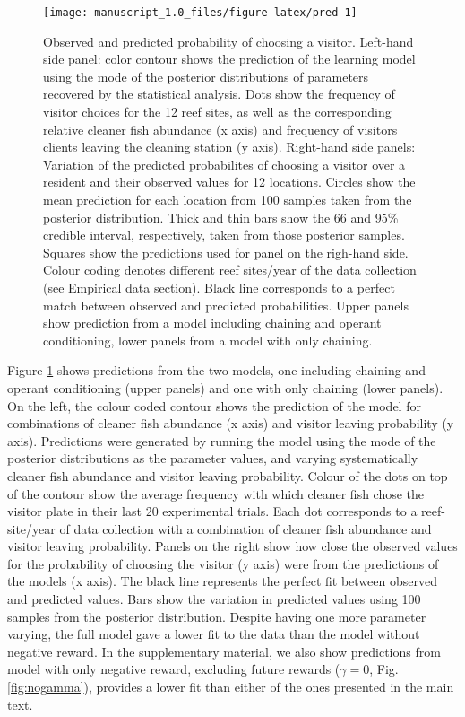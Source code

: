 \documentclass[]{rsos}%
\begin{document}
\begin{figure}

{\centering \texttt{[image: manuscript\_1.0\_files/figure-latex/pred-1]} 

}

\caption{Observed and predicted probability of choosing a visitor. Left-hand side panel: color contour shows the prediction of the learning model using the mode of the posterior distributions of parameters recovered by the statistical analysis. Dots show the frequency of visitor choices for the 12 reef sites, as well as the corresponding relative cleaner fish abundance (x axis) and frequency of visitors clients leaving the cleaning station (y axis). Right-hand side panels: Variation of the predicted probabilites  of choosing a visitor over a resident and their observed values for 12 locations. Circles show the mean prediction for each location from 100 samples taken from the posterior distribution. Thick and thin bars show the 66 and 95\% credible interval, respectively, taken from those posterior samples. Squares show the predictions used for panel on the righ-hand side. Colour coding denotes different reef sites/year of the data collection (see Empirical data section). Black line corresponds to a perfect match between observed and predicted probabilities. Upper panels show prediction from a model including chaining and operant conditioning, lower panels from a  model with only chaining.}\label{fig:pred}
\end{figure}

Figure \ref{fig:pred} shows predictions from the two models,
one including chaining and operant conditioning (upper panels) and
one with only chaining (lower panels). On the
left, the colour coded contour shows the prediction of the model for
combinations of cleaner fish abundance (x axis) and visitor leaving
probability (y axis). Predictions were generated by running the model
using the mode of the posterior distributions as the parameter values,
and varying systematically cleaner fish abundance and visitor leaving
probability. Colour of the dots on top of the contour show the average
frequency with which cleaner fish chose the visitor plate in their last
20 experimental trials. Each dot corresponds to a reef-site/year of
data collection with a combination of cleaner fish abundance
and visitor leaving probability. Panels
on the right show how close the observed values for the probability of
choosing the visitor (y axis) were from the predictions of the models (x
axis). The black line represents the perfect fit between observed and
predicted values. Bars show the variation in predicted values using 100
samples from the posterior distribution. Despite having one more
parameter varying, the full model
gave a lower fit to the data than the model without negative reward.
In the supplementary material, we also show predictions from
model with only negative reward, excluding future rewards (\(\gamma=0\),
Fig. \ref{fig:nogamma}), provides a lower fit than either of the ones
presented in the main text.
\end{document}
